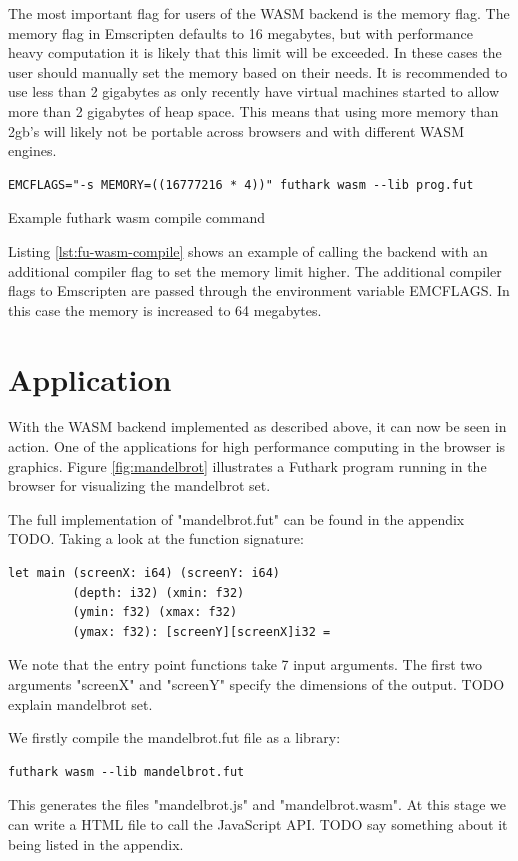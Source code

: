 \documentclass[11pt]{book}
\begin{document}
The most important flag for users of the WASM backend is the memory flag. The memory flag in Emscripten defaults to 16 megabytes, but with performance heavy computation it is likely that this limit will be exceeded. In these cases the user should manually set the memory based on their needs. It is recommended to use less than 2 gigabytes as only recently have virtual machines started to allow more than 2 gigabytes of heap space. This means that using more memory than 2gb's will likely not be portable across browsers and with different WASM engines. 

\begin{listing}
\begin{verbatim}
EMCFLAGS="-s MEMORY=((16777216 * 4))" futhark wasm --lib prog.fut
\end{verbatim}
\caption{Example futhark wasm compile command}
\label{lst:fu-wasm-compile}
\end{listing}

Listing \ref{lst:fu-wasm-compile} shows an example of calling the backend with an additional compiler flag to set the memory limit higher. The additional compiler flags to Emscripten are passed through the environment variable EMCFLAGS. In this case the memory is increased to 64 megabytes.
\section{Application}

With the WASM backend implemented as described above, it can now be seen in action. One of the applications for high performance computing in the browser is graphics. Figure \ref{fig:mandelbrot} illustrates a Futhark program running in the browser for visualizing the mandelbrot set. 

The full implementation of "mandelbrot.fut" can be found in the appendix TODO. Taking a look at the function signature:
\begin{verbatim}
let main (screenX: i64) (screenY: i64)
         (depth: i32) (xmin: f32)
         (ymin: f32) (xmax: f32)
         (ymax: f32): [screenY][screenX]i32 =
\end{verbatim}

We note that the entry point functions take 7 input arguments. The first two arguments "screenX" and "screenY" specify the dimensions of the output. TODO explain mandelbrot set.

We firstly compile the mandelbrot.fut file as a library:
\begin{verbatim}
futhark wasm --lib mandelbrot.fut
\end{verbatim}
This generates the files "mandelbrot.js" and "mandelbrot.wasm". At this stage we can write a HTML file to call the JavaScript API.
TODO say something about it being listed in the appendix.
\end{document}
